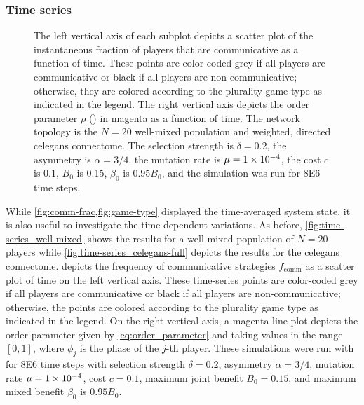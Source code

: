 \documentclass[pdflatex,lineno,referee,sn-mathphys-ay]{sn-jnl}
\begin{document}
\subsubsection{Time series}
\begin{figure}
  \centering
  
  \caption{
    The left vertical axis of each subplot depicts a scatter plot of
    the instantaneous fraction of players that are communicative
    as a function of time.
    These points are color-coded
    grey if all players are communicative or
    black if all players are non-communicative;
    otherwise, they are colored according
    to the plurality game type as indicated in the legend.
    The right vertical axis depicts the order parameter $\rho$
    () in magenta as a function of time.
    The network topology is the
    $N=20$ well-mixed population
    and
    weighted, directed \gls{celegans} connectome.
    The selection strength is $\delta=0.2$,
    the asymmetry is $\alpha=3/4$,
    the mutation rate is $\mu=\num{1E-4}$,
    the cost $c$ is \num{0.1},
    $B_0$ is \num{0.15},
    $\beta_0$ is $\num{0.95} B_0$,
    and the simulation was run for \num{8E6} time steps.
  }
  \label{fig:time-series}
\end{figure}

While \cref{fig:comm-frac,fig:game-type} displayed
the time-averaged system state,
it is also useful to investigate the time-dependent variations.
As before, \cref{fig:time-series_well-mixed} shows the results
for a well-mixed population of $N=20$ players
while \cref{fig:time-series_celegans-full} depicts the results
for the \gls{celegans} connectome.
 depicts the frequency
of communicative strategies $f_{\text{comm}}$
as a scatter plot of time on the left vertical axis.
These time-series points are color-coded
grey if all players are communicative or
black if all players are non-communicative;
otherwise, the points are colored according
to the plurality game type as indicated in the legend.
On the right vertical axis,
a magenta line plot depicts the order parameter
given by \cref{eq:order_parameter} and
taking values in the range $[0,1]$,
where $\phi_j$ is the phase of the $j$-th player.
These simulations were run with
for \num{8E6} time steps with
selection strength $\delta = 0.2$,
asymmetry $\alpha = 3/4$,
mutation rate $\mu=\num{1E-4}$,
cost $c = \num{0.1}$,
maximum joint benefit $B_0 = 0.15$,
and maximum mixed benefit $\beta_0$ is $\num{0.95} B_0$.
\end{document}
